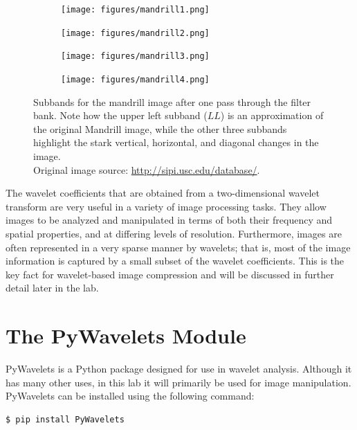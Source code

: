\begin{figure}
\centering
        \begin{subfigure}{0.4\textwidth}\centering
                    \texttt{[image: figures/mandrill1.png]}
       \end{subfigure}%
        \begin{subfigure}{0.4\textwidth}\centering
                    \texttt{[image: figures/mandrill2.png]}
       \end{subfigure}%
    \hfill
        \begin{subfigure}{0.4\textwidth}\centering
                    \texttt{[image: figures/mandrill3.png]}
       \end{subfigure}%
        \begin{subfigure}{0.4\textwidth}\centering
                    \texttt{[image: figures/mandrill4.png]}
       \end{subfigure}
    \caption{Subbands for the mandrill image after one pass through the filter bank.
    Note how the upper left subband ($LL$) is an approximation of the original Mandrill image, while the other
    three subbands highlight the stark vertical, horizontal, and diagonal changes in the image.\\
    Original image source: \url{http://sipi.usc.edu/database/}.}
    \label{fig:dwt2D}
\end{figure}

The wavelet coefficients that are obtained from a two-dimensional wavelet transform are very useful in a variety of image processing tasks.
They allow images to be analyzed and manipulated in terms of both their frequency and spatial properties, and at differing levels of resolution.
Furthermore, images are often represented in a very sparse manner by wavelets; that is, most of the image information is captured by a small subset of the wavelet coefficients.
This is the key fact for wavelet-based image compression and will be discussed in further detail later in the lab.

\section*{The PyWavelets Module} %

PyWavelets is a Python package designed for use in wavelet analysis.
Although it has many other uses, in this lab it will primarily be used for image manipulation.
PyWavelets can be installed using the following command:
\begin{lstlisting}
$ pip install PyWavelets
\end{lstlisting}

